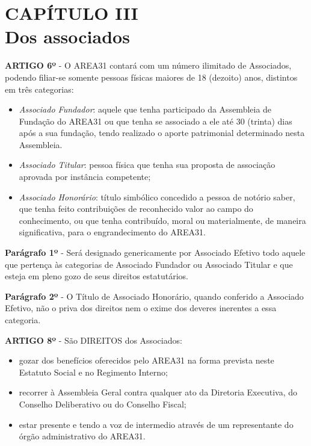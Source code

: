 \chapter*{CAPÍTULO III \\ Dos associados}


\textbf{ARTIGO 6º} - O AREA31 contará com um número ilimitado de Associados, 
podendo filiar-se somente pessoas físicas maiores de 18 (dezoito) anos, 
distintos em três categorias:

\begin{itemize}
    \item \emph{Associado Fundador}: aquele que tenha participado da 
        Assembleia de Fundação do AREA31 ou que tenha se associado a ele 
        até 30 (trinta) dias após a sua fundação, tendo realizado o aporte 
        patrimonial determinado nesta Assembleia.
    \item \emph{Associado Titular}: pessoa física que tenha sua proposta de 
        associação aprovada por instância competente;
    \item \emph{Associado Honorário}: título simbólico concedido a pessoa de 
        notório saber, que tenha feito contribuições de reconhecido valor ao 
        campo do conhecimento, ou que tenha contribuído, moral ou 
        materialmente, de maneira significativa, para o 
        engrandecimento do AREA31.
\end{itemize}

\textbf{Parágrafo 1º} - Será designado genericamente por Associado Efetivo 
todo aquele que pertença às categorias de Associado Fundador ou Associado 
Titular e que esteja em pleno gozo de seus direitos estatutários.

\bigskip

\textbf{Parágrafo 2º} - O Título de Associado Honorário, quando conferido a 
Associado Efetivo, não o priva dos direitos nem o exime dos deveres 
inerentes a essa categoria.

\bigskip

\textbf{ARTIGO 8º} - São DIREITOS dos Associados:

\begin{itemize}
    \item gozar dos benefícios oferecidos pelo AREA31 na forma prevista 
        neste Estatuto Social e no Regimento Interno; 
    \item recorrer à Assembleia Geral contra qualquer ato da Diretoria 
        Executiva, do Conselho Deliberativo ou do Conselho Fiscal;
    \item estar presente e tendo a voz de intermedio através de um 
        representante do órgão administrativo do AREA31.
\end{itemize}


